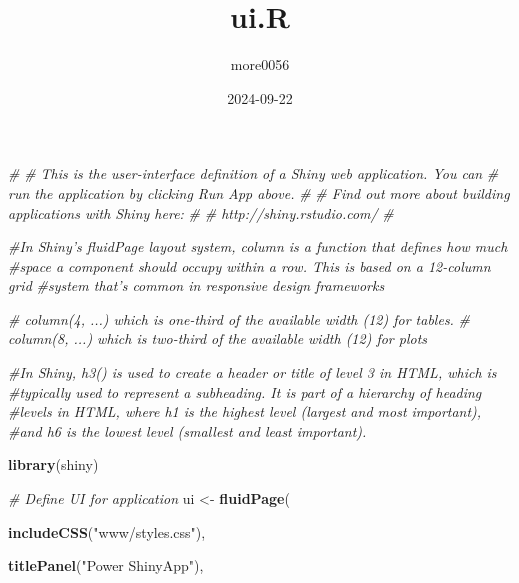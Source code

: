 \documentclass[
]{article}
\title{ui.R}
\author{more0056}
\date{2024-09-22}
\newenvironment{Shaded}{\begin{snugshade}}{\end{snugshade}}
\newcommand{\CommentTok}[1]{\textcolor[rgb]{0.56,0.35,0.01}{\textit{#1}}}
\newcommand{\FunctionTok}[1]{\textcolor[rgb]{0.13,0.29,0.53}{\textbf{#1}}}
\newcommand{\NormalTok}[1]{#1}
\newcommand{\OtherTok}[1]{\textcolor[rgb]{0.56,0.35,0.01}{#1}}
\newcommand{\StringTok}[1]{\textcolor[rgb]{0.31,0.60,0.02}{#1}}
\begin{document}
\maketitle

\begin{Shaded}
\begin{Highlighting}[]
\CommentTok{\#}
\CommentTok{\# This is the user{-}interface definition of a Shiny web application. You can}
\CommentTok{\# run the application by clicking \textquotesingle{}Run App\textquotesingle{} above.}
\CommentTok{\#}
\CommentTok{\# Find out more about building applications with Shiny here:}
\CommentTok{\#}
\CommentTok{\#    http://shiny.rstudio.com/}
\CommentTok{\#}

\CommentTok{\#In Shiny’s fluidPage layout system, column is a function that defines how much}
\CommentTok{\#space a component should occupy within a row. This is based on a 12{-}column grid}
\CommentTok{\#system that’s common in responsive design frameworks}

\CommentTok{\# column(4, ...) which is one{-}third of the available width (12) for tables.}
\CommentTok{\# column(8, ...) which is two{-}third of the available width (12) for plots}

\CommentTok{\#In Shiny, h3() is used to create a header or title of level 3 in HTML, which is}
\CommentTok{\#typically used to represent a subheading. It is part of a hierarchy of heading }
\CommentTok{\#levels in HTML, where h1 is the highest level (largest and most important), }
\CommentTok{\#and h6 is the lowest level (smallest and least important).}


\FunctionTok{library}\NormalTok{(shiny)}

\CommentTok{\# Define UI for application}
\NormalTok{ui }\OtherTok{\textless{}{-}} \FunctionTok{fluidPage}\NormalTok{(}
  
  \FunctionTok{includeCSS}\NormalTok{(}\StringTok{"www/styles.css"}\NormalTok{),}

  
  \FunctionTok{titlePanel}\NormalTok{(}\StringTok{"Power ShinyApp"}\NormalTok{),}
  
  
  

\end{Highlighting}
\end{Shaded}
\end{document}
